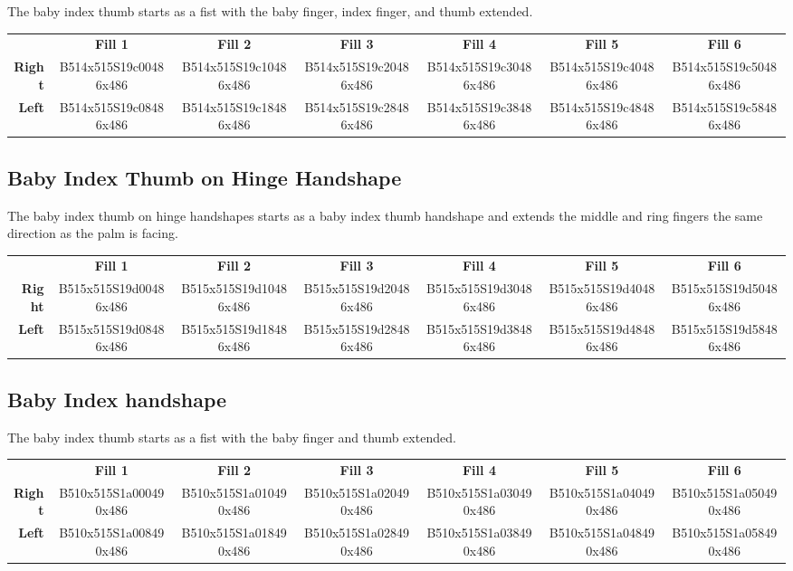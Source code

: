 \documentclass{article}
\begin{document}
The baby index thumb starts as a fist with the baby finger, index finger, and thumb extended.

\begin{center}
\begin{tabular}{r*{6}{c}}
&\textbf{Fill 1}&\textbf{Fill 2}&\textbf{Fill 3}&\textbf{Fill 4}&\textbf{Fill 5}&\textbf{Fill 6}\\
\textbf{Right}&
B514x515S19c00486x486&
B514x515S19c10486x486&
B514x515S19c20486x486&
B514x515S19c30486x486&
B514x515S19c40486x486&
B514x515S19c50486x486\\
\textbf{Left}&
B514x515S19c08486x486&
B514x515S19c18486x486&
B514x515S19c28486x486&
B514x515S19c38486x486&
B514x515S19c48486x486&
B514x515S19c58486x486\\
\end{tabular}
\end{center}

\subsection{Baby Index Thumb on Hinge Handshape}

The baby index thumb on hinge handshapes starts as a baby index thumb handshape and extends the middle and ring fingers the same direction as the palm is facing.

\begin{center}
\begin{tabular}{r*{6}{c}}
&\textbf{Fill 1}&\textbf{Fill 2}&\textbf{Fill 3}&\textbf{Fill 4}&\textbf{Fill 5}&\textbf{Fill 6}\\
\textbf{Right}&
B515x515S19d00486x486&
B515x515S19d10486x486&
B515x515S19d20486x486&
B515x515S19d30486x486&
B515x515S19d40486x486&
B515x515S19d50486x486\\
\textbf{Left}&
B515x515S19d08486x486&
B515x515S19d18486x486&
B515x515S19d28486x486&
B515x515S19d38486x486&
B515x515S19d48486x486&
B515x515S19d58486x486\\
\end{tabular}
\end{center}

\subsection{Baby Index handshape}

The baby index thumb starts as a fist with the baby finger and thumb extended.

\begin{center}
\begin{tabular}{r*{6}{c}}
&\textbf{Fill 1}&\textbf{Fill 2}&\textbf{Fill 3}&\textbf{Fill 4}&\textbf{Fill 5}&\textbf{Fill 6}\\
\textbf{Right}&
B510x515S1a000490x486&
B510x515S1a010490x486&
B510x515S1a020490x486&
B510x515S1a030490x486&
B510x515S1a040490x486&
B510x515S1a050490x486\\
\textbf{Left}&
B510x515S1a008490x486&
B510x515S1a018490x486&
B510x515S1a028490x486&
B510x515S1a038490x486&
B510x515S1a048490x486&
B510x515S1a058490x486\\
\end{tabular}
\end{center}
\end{document}

